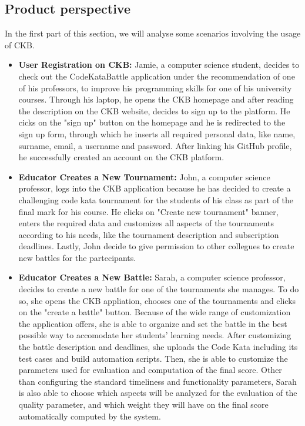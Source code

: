\documentclass[a4paper, 11pt, titlepage]{article}
\begin{document}
\subsection{Product perspective}
In the first part of this section, we will analyse some scenarios involving the usage of CKB.
\begin{itemize}
    \item \textbf{User Registration on CKB:} 
    Jamie, a computer science student, decides to check out the CodeKataBattle application under the
    recommendation of one of his professors, to improve his programming skills for one of his university courses.
    Through his laptop, he opens the CKB homepage and after reading the description on the CKB website, decides to sign up to the platform.
    He cicks on the "sign up" button on the homepage and he is redirected to the sign up form, through which he inserts all required personal data,
    like name, surname, email, a username and password. After linking his GitHub profile, he successfully created an account on the CKB platform.
    
    \item \textbf{Educator Creates a New Tournament:} John, a computer science professor, logs into the CKB application because he has decided to create
     a challenging code kata tournament for the students of his class as part of the final mark for his course. He clicks on "Create new tournament"
      banner, enters the required data and customizes all aspects of the tournaments according to his needs, like the tournament description and subscription deadlines. Lastly,
       John decide to give permission to other collegues to create new battles for the partecipants.

    \item \textbf{Educator Creates a New Battle:} Sarah, a computer science professor, decides to create a new battle for one of the tournaments she manages.
    To do so, she opens the CKB appliation, chooses one of the tournaments and clicks on the "create a battle" button. Because of the wide range of customization the application offers, she is able to organize and set the 
    battle in the best possible way to accomodate her students' learning needs. After customizing the battle description and deadlines, she uploads the Code Kata including its test cases and build automation scripts. Then,
    she is able to customize the parameters used for evaluation and computation of the final score. Other than configuring the standard timeliness and functionality parameters, Sarah is also able to choose which aspects will be 
    analyzed for the evaluation of the quality parameter, and which weight they will have on the final score automatically computed by the system.


\end{itemize}
\end{document}
